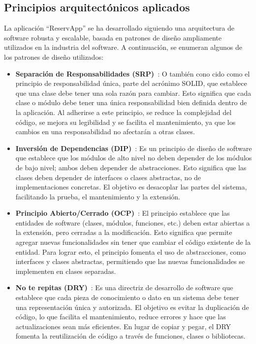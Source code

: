 \subsection{Principios arquitectónicos aplicados}
La aplicación ``ReservApp'' se ha desarrollado siguiendo una arquitectura de software robusta y escalable, basada en patrones de diseño ampliamente utilizados en la industria del software. A continuación, se enumeran algunos de los patrones de diseño utilizados:

\begin{itemize}
    \item \textbf{Separación de Responsabilidades (SRP)}~\cite{principio-srp}: O también cono cido como el principio de responsabilidad única, parte del acrónimo SOLID, que establece que una clase debe tener una sola razón para cambiar. Esto significa que cada clase o módulo debe tener una única responsabilidad bien definida dentro de la aplicación. Al adherirse a este principio, se reduce la complejidad del código, se mejora su legibilidad y se facilita el mantenimiento, ya que los cambios en una responsabilidad no afectarán a otras clases.
    \item \textbf{Inversión de Dependencias (DIP)}~\cite{patron-repository}: Es un principio de diseño de software que establece que los módulos de alto nivel no deben depender de los módulos de bajo nivel; ambos deben depender de abstracciones. Esto significa que las clases deben depender de interfaces o clases abstractas, no de implementaciones concretas. El objetivo es desacoplar las partes del sistema, facilitando la prueba, el mantenimiento y la extensión.
    \item \textbf{Principio Abierto/Cerrado (OCP)}~\cite{principio-ocp}: El principio establece que las entidades de software (clases, módulos, funciones, etc.) deben estar abiertas a la extensión, pero cerradas a la modificación. Esto significa que permite agregar nuevas funcionalidades sin tener que cambiar el código existente de la entidad. Para lograr esto, el principio fomenta el uso de abstracciones, como interfaces y clases abstractas, permitiendo que las nuevas funcionalidades se implementen en clases separadas.
    \item \textbf{No te repitas (DRY)}~\cite{principio-dry}: Es una directriz de desarrollo de software que establece que cada pieza de conocimiento o dato en un sistema debe tener una representación única y autorizada. El objetivo es evitar la duplicación de código, lo que facilita el mantenimiento, reduce errores y hace que las actualizaciones sean más eficientes. En lugar de copiar y pegar, el DRY fomenta la reutilización de código a través de funciones, clases o bibliotecas.
\end{itemize}


